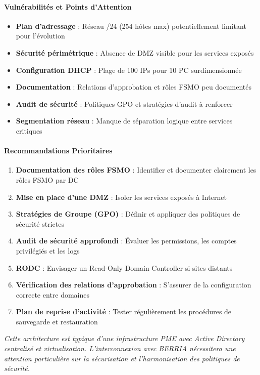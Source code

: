 \paragraph{Vulnérabilités et Points d'Attention}
\begin{itemize}
	\item[$\times$] \textbf{Plan d'adressage} : Réseau /24 (254 hôtes max) potentiellement limitant pour l'évolution
	\item[$\times$] \textbf{Sécurité périmétrique} : Absence de DMZ visible pour les services exposés
	\item[$\times$] \textbf{Configuration DHCP} : Plage de 100 IPs pour 10 PC surdimensionnée
	\item[$\times$] \textbf{Documentation} : Relations d'approbation et rôles FSMO peu documentés
	\item[$\times$] \textbf{Audit de sécurité} : Politiques GPO et stratégies d'audit à renforcer
	\item[$\times$] \textbf{Segmentation réseau} : Manque de séparation logique entre services critiques
\end{itemize}

\paragraph{Recommandations Prioritaires}
\begin{enumerate}
	\item \textbf{Documentation des rôles FSMO} : Identifier et documenter clairement les rôles FSMO par DC
	\item \textbf{Mise en place d'une DMZ} : Isoler les services exposés à Internet
	\item \textbf{Stratégies de Groupe (GPO)} : Définir et appliquer des politiques de sécurité strictes
	\item \textbf{Audit de sécurité approfondi} : Évaluer les permissions, les comptes privilégiés et les logs
	\item \textbf{RODC} : Envisager un Read-Only Domain Controller si sites distants
	\item \textbf{Vérification des relations d'approbation} : S'assurer de la configuration correcte entre domaines
	\item \textbf{Plan de reprise d'activité} : Tester régulièrement les procédures de sauvegarde et restauration
\end{enumerate}

\vspace{0.3cm}
\noindent \textit{Cette architecture est typique d'une infrastructure PME avec Active Directory centralisé et virtualisation. L'interconnexion avec BERRIA nécessitera une attention particulière sur la sécurisation et l'harmonisation des politiques de sécurité.}

